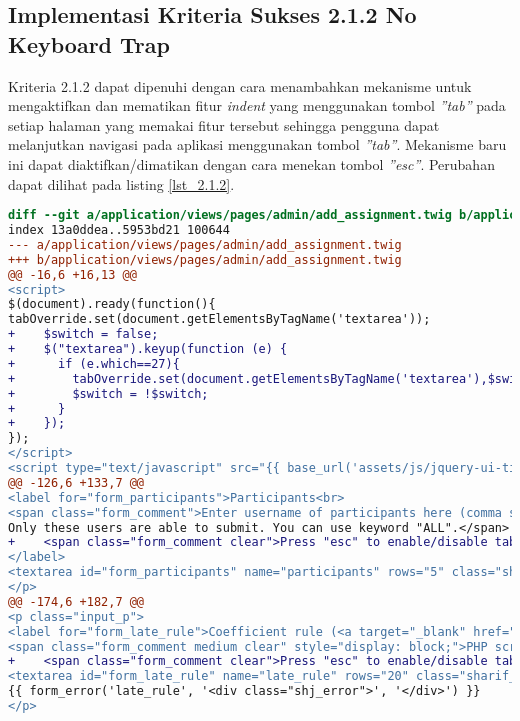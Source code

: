 \subsection{Implementasi Kriteria Sukses 2.1.2 No Keyboard Trap}
\label{subsec:implementasi_A_2.1.2}

Kriteria 2.1.2 dapat dipenuhi dengan cara menambahkan mekanisme untuk mengaktifkan dan mematikan fitur \textit{indent} yang menggunakan tombol \textit{''tab''} pada setiap halaman yang memakai fitur tersebut sehingga pengguna dapat melanjutkan navigasi pada aplikasi menggunakan tombol \textit{''tab''}. Mekanisme baru ini dapat diaktifkan/dimatikan dengan cara menekan tombol \textit{''esc''}. Perubahan dapat dilihat pada listing \ref{lst_2.1.2}.

\begin{lstlisting}[language=diff, caption=Perubahan untuk mematuhi kriteria 2.1.2, label=lst_2.1.2, basicstyle=\ttfamily, frame=single,
columns=fullflexible, keepspaces=true, breaklines=true]
diff --git a/application/views/pages/admin/add_assignment.twig b/application/views/pages/admin/add_assignment.twig
index 13a0ddea..5953bd21 100644
--- a/application/views/pages/admin/add_assignment.twig
+++ b/application/views/pages/admin/add_assignment.twig
@@ -16,6 +16,13 @@
<script>
$(document).ready(function(){
tabOverride.set(document.getElementsByTagName('textarea'));
+    $switch = false;
+    $("textarea").keyup(function (e) {
+      if (e.which==27){
+        tabOverride.set(document.getElementsByTagName('textarea'),$switch);
+        $switch = !$switch;
+      }
+    });
});
</script>
<script type="text/javascript" src="{{ base_url('assets/js/jquery-ui-timepicker-addon.js') }}"></script>
@@ -126,6 +133,7 @@
<label for="form_participants">Participants<br>
<span class="form_comment">Enter username of participants here (comma separated).
Only these users are able to submit. You can use keyword "ALL".</span>
+    <span class="form_comment clear">Press "esc" to enable/disable tabindent</span>
</label>
<textarea id="form_participants" name="participants" rows="5" class="sharif_input medium">{{ edit ? edit_assignment.participants : set_value('participants', 'ALL') }}</textarea>
</p>
@@ -174,6 +182,7 @@
<p class="input_p">
<label for="form_late_rule">Coefficient rule (<a target="_blank" href="https://github.com/ifunpar/Sharif-Judge/blob/docs/v1.4/add_assignment.md#coefficient-rule">?</a>)</label><br>
<span class="form_comment medium clear" style="display: block;">PHP script without &lt;?php ?&gt; tags</span>
+    <span class="form_comment clear">Press "esc" to enable/disable tabindent</span><br>
<textarea id="form_late_rule" name="late_rule" rows="20" class="sharif_input add_text">{{ edit ? edit_assignment.late_rule : set_value('late_rule', default_late_rule) }}</textarea>
{{ form_error('late_rule', '<div class="shj_error">', '</div>') }}
</p>


\end{lstlisting}
